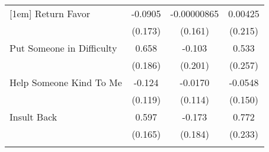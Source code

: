 {\begin{tabular}{l*{3}{c}}
[1em]
Return Favor&     -0.0905         & -0.00000865         &     0.00425         \\
            &     (0.173)         &     (0.161)         &     (0.215)         \\
[1em]
Put Someone in Difficulty&       0.658\sym{***}&      -0.103         &       0.533\sym{*}  \\
            &     (0.186)         &     (0.201)         &     (0.257)         \\
[1em]
Help Someone Kind To Me&      -0.124         &     -0.0170         &     -0.0548         \\
            &     (0.119)         &     (0.114)         &     (0.150)         \\
[1em]
Insult Back &       0.597\sym{***}&      -0.173         &       0.772\sym{***}\\
            &     (0.165)         &     (0.184)         &     (0.233)         \\
\hline\hline
{}\\
\end{tabular}
}
